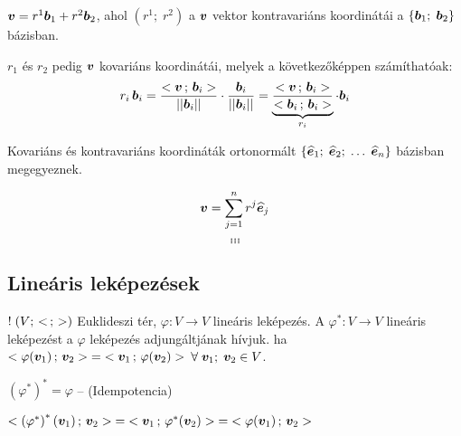\documentclass[main.tex]{subfiles}
\begin{document}
\vspace*{1.5em}
$\bm{v} = r^1 \bm{b}_1 + r^2 \bm{b}_2$, ahol
$(r^1 ; \; r^2)$ a $\bm{v}$ vektor kontravariáns koordinátái
a $\left\{ \bm{b}_1 ; \; \bm{b}_2 \right\}$ bázisban.

\vspace*{.5em}
$r_1$ és $r_2$ pedig $\bm{v}$ kovariáns koordinátái,
melyek a következőképpen számíthatóak:
\begin{equation*}
  r_i \, \bm{b}_i = \frac{
    < \bm{v} \, ; \, \bm{b}_i >
  }{\left|\left| \bm{b}_i \right|\right|} \cdot \frac{
    \bm{b}_i
  }{\left|\left| \bm{b}_i \right|\right|}
  = \underbrace{\frac{
      < \bm{v} \, ; \, \bm{b}_i >
    }{< \bm{b}_i \, ; \, \bm{b}_i >}}_{r_i}
  \cdot \bm{b}_i
\end{equation*}



Kovariáns és kontravariáns koordináták ortonormált
$\left\{ \widehat{\bm{e}}_1 ; \; \widehat{\bm{e}}_2 ; \; \dots \; \widehat{\bm{e}}_n \right\}$
bázisban megegyeznek.


\begin{equation*}
  \bm{v} = \sum_{j=1}^n r^j \widehat{\bm{e}}_j
\end{equation*}
\begin{equation*}
  \dots
\end{equation*}
\begin{equation*}
  \dots
\end{equation*}
\begin{equation*}
  \dots
\end{equation*}

\subsection{Lineáris leképezések}


$! \; (V; \, <  \, ; \,  >)$ Euklideszi tér,
$\varphi: V \rightarrow V$ lineáris leképezés.
A $\varphi^{*} : V \rightarrow V$ lineáris leképezést
a $\varphi$ leképezés adjungáltjának hívjuk. ha
$< \varphi(\bm{v}_1) \, ; \, \bm{v}_2 >
  \; = \; < \bm{v}_1 \, ; \, \varphi(\bm{v}_2) >$
$\forall \; \bm{v}_1 ;\; \bm{v}_2 \in V$.

$\left( \varphi^{*} \right)^{*} = \varphi$
\hspace{2mm} – \hspace{2mm} (Idempotencia)

$< \left( \varphi^{*} \right)^{*}(\bm{v}_1) \, ; \, \bm{v}_2 >
  \; = \; < \bm{v}_1 \, ; \, \varphi^{*}(\bm{v}_2) >
  \; = \; < \varphi(\bm{v}_1) \, ; \, \bm{v}_2 >$
\end{document}
